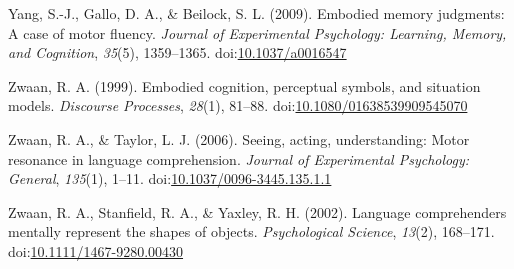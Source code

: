 \documentclass[english,man]{apa6}
\theoremstyle{definition}
\theoremstyle{definition}
\theoremstyle{definition}
\theoremstyle{remark}
\begin{document}
\hypertarget{ref-Yang2009}{}
Yang, S.-J., Gallo, D. A., \& Beilock, S. L. (2009). Embodied memory
judgments: A case of motor fluency. \emph{Journal of Experimental
Psychology: Learning, Memory, and Cognition}, \emph{35}(5), 1359--1365.
doi:\href{https://doi.org/10.1037/a0016547}{10.1037/a0016547}

\hypertarget{ref-Zwaan1999}{}
Zwaan, R. A. (1999). Embodied cognition, perceptual symbols, and
situation models. \emph{Discourse Processes}, \emph{28}(1), 81--88.
doi:\href{https://doi.org/10.1080/01638539909545070}{10.1080/01638539909545070}

\hypertarget{ref-Zwaan2006}{}
Zwaan, R. A., \& Taylor, L. J. (2006). Seeing, acting, understanding:
Motor resonance in language comprehension. \emph{Journal of Experimental
Psychology: General}, \emph{135}(1), 1--11.
doi:\href{https://doi.org/10.1037/0096-3445.135.1.1}{10.1037/0096-3445.135.1.1}

\hypertarget{ref-Zwaan2002}{}
Zwaan, R. A., Stanfield, R. A., \& Yaxley, R. H. (2002). Language
comprehenders mentally represent the shapes of objects.
\emph{Psychological Science}, \emph{13}(2), 168--171.
doi:\href{https://doi.org/10.1111/1467-9280.00430}{10.1111/1467-9280.00430}
\end{document}
